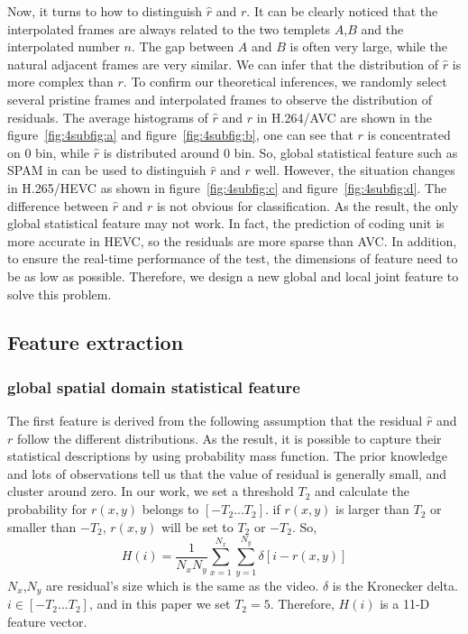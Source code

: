 \documentclass[pdftex,twocolumn,epjc3]{svjour3}          %
\begin{document}
Now, it turns to how to distinguish $\hat{r}$ and $r$. It can be clearly noticed that the interpolated frames are always related to the two templets $A$,$B$ and the interpolated number $n$. The gap between $A$ and $B$ is often very large, while the natural adjacent frames are very similar. We can infer that the distribution of $\hat{r}$ is more complex than $r$.
To confirm our theoretical inferences, we randomly select several pristine frames and interpolated frames to observe the distribution of residuals. The average histograms of $\hat{r}$ and $r$ in H.264/AVC are shown in the figure~\ref{fig:4subfig:a} and figure~\ref{fig:4subfig:b}, one can see that $r$ is concentrated on 0 bin, while $\hat{r}$ is distributed around 0 bin. So, global statistical feature such as SPAM in \cite{A19} can be used to distinguish $\hat{r}$ and $r$ well. However, the situation changes in H.265/HEVC as shown in figure~\ref{fig:4subfig:c} and figure~\ref{fig:4subfig:d}. The difference between $\hat{r}$ and $r$ is not obvious for classification. As the result, the only global statistical feature may not work. In fact, the prediction of coding unit is more accurate in HEVC, so the residuals are more sparse than AVC. In addition, to ensure the real-time performance of the test, the dimensions of feature need to be as low as possible. Therefore, we design a new global and local joint feature to solve this problem.


\subsection{Feature extraction}
\label{sec:sub33}
\subsubsection{global spatial domain statistical feature}
The first feature is derived from the following assumption that the residual $\hat{r}$ and $r$ follow the different distributions. As the result, it is possible to capture their statistical descriptions by using probability mass function. The prior knowledge and lots of observations tell us that the value of residual is generally small, and cluster around zero. In our work, we set a threshold $T_2$ and calculate the probability for $r(x, y)$ belongs to $[-T_2...T_2]$. if $r(x, y)$ is larger than $T_2$ or smaller than $-T_2$, $r(x, y)$ will be set to $T_2$ or $-T_2$. So,
\begin{equation}
H(i)=\frac{1}{N_x N_y}\sum_{x=1}^{N_x} \sum_{y=1}^{N_y} \delta[i-r(x,y)]
\end{equation}
$N_x$,$N_y$ are residual's size which is the same as the video. $\delta$ is the Kronecker delta. $i\in[-T_2...T_2]$, and in
this paper we set $T_2=5$. Therefore, $H(i)$ is a 11-D feature vector.
\end{document}
